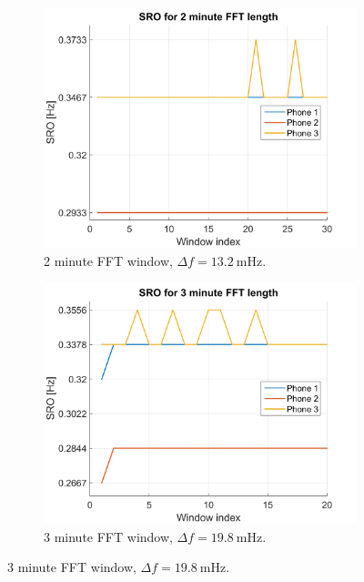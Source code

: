 \documentclass[a4paper, notitlepage]{report}
\begin{document}
\begin{figure}[H]
\begin{adjustwidth}{-1in}{-1in}
	\vspace{10pt}
	\begin{subfigure}{0.5\textwidth}
		\includegraphics[width=\textwidth]{figures/sro-measurement/sro-2min}
		\caption{2 minute FFT window, $\Delta f=13.2~\mathrm{mHz}$.}
		\label{app:sro_2min}
	\end{subfigure}
	\begin{subfigure}{0.5\textwidth}
		\includegraphics[width=\textwidth]{figures/sro-measurement/sro-3min}
		\caption{3 minute FFT window, $\Delta f=19.8~\mathrm{mHz}$.}
		\label{app:sro_3min}
	\end{subfigure}
	

\end{adjustwidth}
\end{figure}
\end{document}
